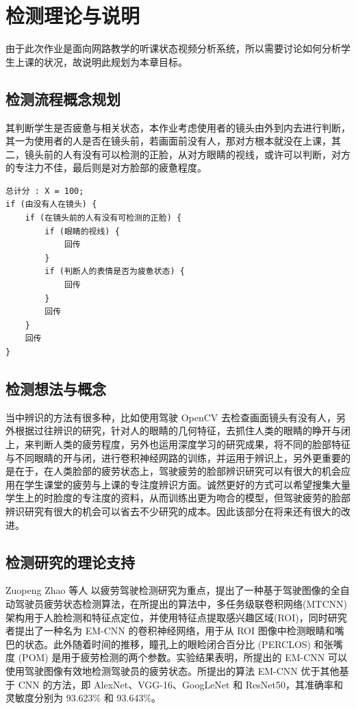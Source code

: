 \chapter{检测理论与说明}
\label{chap:3}

由于此次作业是面向网路教学的听课状态视频分析系统，所以需要讨论如何分析学生上课的状况，故说明此规划为本章目标。

\section{检测流程概念规划}

其判断学生是否疲惫与相关状态，本作业考虑使用者的镜头由外到内去进行判断，其一为使用者的人是否在镜头前，若画面前没有人，那对方根本就没在上课，其二，镜头前的人有没有可以检测的正脸，从对方眼睛的视线，或许可以判断，对方的专注力不佳，最后则是对方脸部的疲惫程度。

\begin{Verbatim}
总计分 : X = 100;
if (由没有人在镜头) {
    if (在镜头前的人有没有可检测的正脸) {
        if (眼睛的视线) {
            回传
        }
        if (判断人的表情是否为疲惫状态) {
            回传
        }
        回传
    }
    回传
}
\end{Verbatim}

\section{检测想法与概念}

当中辨识的方法有很多种，比如使用驾驶 OpenCV 去检查画面镜头有没有人，另外根据过往辨识的研究，针对人的眼睛的几何特征，去抓住人类的眼睛的睁开与闭上，来判断人类的疲劳程度，另外也运用深度学习的研究成果，将不同的脸部特征与不同眼睛的开与闭，进行卷积神经网路的训练，并运用于辨识上，另外更重要的是在于，在人类脸部的疲劳状态上，驾驶疲劳的脸部辨识研究可以有很大的机会应用在学生课堂的疲劳与上课的专注度辨识方面。诚然更好的方式可以希望搜集大量学生上的时脸度的专注度的资料，从而训练出更为吻合的模型，但驾驶疲劳的脸部辨识研究有很大的机会可以省去不少研究的成本。因此该部分在将来还有很大的改进。

\section{检测研究的理论支持}

Zuopeng Zhao 等人 \cite{zhao2020driver} 以疲劳驾驶检测研究为重点，提出了一种基于驾驶图像的全自动驾驶员疲劳状态检测算法，在所提出的算法中，多任务级联卷积网络(MTCNN)架构用于人脸检测和特征点定位，并使用特征点提取感兴趣区域(ROI)，同时研究者提出了一种名为 EM-CNN 的卷积神经网络，用于从 ROI 图像中检测眼睛和嘴巴的状态。此外随着时间的推移，瞳孔上的眼睑闭合百分比 (PERCLOS) 和张嘴度 (POM) 是用于疲劳检测的两个参数。实验结果表明，所提出的 EM-CNN 可以使用驾驶图像有效地检测驾驶员的疲劳状态。所提出的算法 EM-CNN 优于其他基于 CNN 的方法，即 AlexNet、VGG-16、GoogLeNet 和 ResNet50，其准确率和灵敏度分别为 93.623\% 和 93.643\%。

